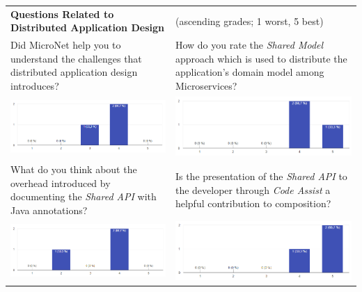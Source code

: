 \begin{center}
  	\hspace*{-1.9cm}
  	\begin{tabular}{ p{8.7cm} p{8.7cm} }
  
    	\textbf{Questions Related to Distributed Application Design} & 
  		(ascending grades; 1 worst, 5 best) \\[1cm]
  		
  		Did MicroNet help you to understand the challenges that distributed
  		application design introduces? &
  		How do you rate the \textit{Shared Model} approach which is used to
  		distribute the application's domain model among Microservices?\\
      	\includegraphics[width=\linewidth]{images/survey/app1}
    	&
    	\includegraphics[width=\linewidth]{images/survey/app2}\\[1cm]
    	
    	What do you think about the overhead introduced by documenting the
    	\textit{Shared API} with Java annotations? &
    	Is the presentation of the \textit{Shared API} to the developer through
    	\textit{Code Assist} a helpful contribution to \ms{} composition?\\
    	\includegraphics[width=\linewidth]{images/survey/app3}
    	&
    	\includegraphics[width=\linewidth]{images/survey/app4}\\[1cm]
    	

\end{tabular}
\end{center}

